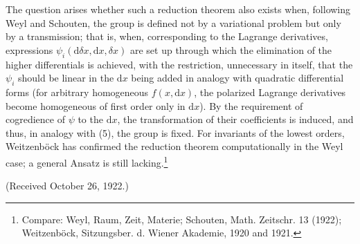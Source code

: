\documentclass[11pt]{article}
\providecommand{\dd}{\mathrm d}
\begin{document}
The question arises whether such a reduction theorem also exists when, following Weyl and Schouten, the group is defined not by a variational problem but only by a transmission; that is, when, corresponding to the Lagrange derivatives, expressions $\psi_i(\dd\delta x,\dd x,\delta x)$ are set up through which the elimination of the higher differentials is achieved, with the restriction, unnecessary in itself, that the $\psi_i$ should be linear in the $\dd x$ being added in analogy with quadratic differential forms (for arbitrary homogeneous $f(x,\dd x)$, the polarized Lagrange derivatives become homogeneous of first order only in $\dd x$). By the requirement of cogredience of $\psi$ to the $\dd x$, the transformation of their coefficients is induced, and thus, in analogy with (5), the group is fixed. For invariants of the lowest orders, Weitzenböck has confirmed the reduction theorem computationally in the Weyl case; a general Ansatz is still lacking.\footnote{Compare: Weyl, Raum, Zeit, Materie; Schouten, Math. Zeitschr. 13 (1922); Weitzenböck, Sitzungsber. d. Wiener Akademie, 1920 and 1921.}

\begin{center}
(Received October 26, 1922.)
\end{center}
\end{document}
